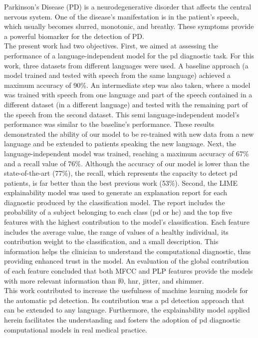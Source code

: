 Parkinson’s Disease (PD) is a neurodegenerative disorder that affects the central nervous system. One of the disease's manifestation is in the patient’s speech, which usually becomes slurred, monotonic, and breathy. These symptoms provide a powerful biomarker for the detection of PD. \\
The present work had two objectives. First, we aimed at assessing the performance of a language-independent model for the \gls{pd} diagnostic task. For this work, three datasets from different languages were used. A baseline approach (a model trained and tested with speech from the same language) achieved a maximum accuracy of 90\%. An intermediate step was also taken, where a model was trained with speech from one language and part of the speech contained in a different dataset (in a different language) and tested with the remaining part of the speech from the second dataset. This semi language-independent model's performance was similar to the baseline's performance. These results demonstrated the ability of our model to be re-trained with new data from a new language and be extended to patients speaking the new language. Next, the language-independent model was trained, reaching a maximum accuracy of 67\% and a recall value of 76\%. Although the accuracy of our model is lower than the state-of-the-art (77\%), the recall, which represents the capacity to detect \gls{pd} patients, is far better than the best previous work (53\%). Second, the LIME explainability model was used to generate an explanation report for each diagnostic produced by the classification model. The report includes the probability of a subject belonging to each class (\gls{pd} or \gls{hc}) and the top five features with the highest contribution to the model's classification. Each feature includes the average value, the range of values of a healthy individual, its contribution weight to the classification, and a small description. This information helps the clinician to understand the computational diagnostic, thus providing enhanced trust in the model. An evaluation of the global contribution of each feature concluded that both MFCC and PLP features provide the models with more relevant information than \gls{f0}, \gls{hnr}, jitter, and shimmer.\\
This work contributed to increase the usefulness of machine learning models for the automatic \gls{pd} detection. Its contribution was a \gls{pd} detection approach that can be extended to any language. Furthermore, the explainability model applied herein facilitates the understanding and fosters the adoption of \gls{pd} diagnostic computational models in real medical practice.

